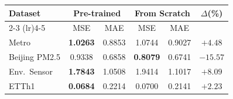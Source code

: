 \begin{tabular}{lccccc}
\toprule
\multirow{2}{*}{Dataset} & \multicolumn{2}{c}{Pre-trained} & \multicolumn{2}{c}{From Scratch} & \multirow{2}{*}{$\Delta$(\%)} \\
\cmidrule(lr){2-3} \cmidrule(lr){4-5}
 & MSE & MAE & MSE & MAE & \\
\midrule
Metro          & \textbf{1.0263} & 0.8853 & 1.0744          & 0.9027 & $+4.48$  \\
Beijing PM2.5  & 0.9338          & 0.6858 & \textbf{0.8079} & 0.6741 & $-15.57$ \\
Env.\ Sensor   & \textbf{1.7843} & 1.0508 & 1.9414          & 1.1017 & $+8.09$  \\
ETTh1          & \textbf{0.0684} & 0.2214 & 0.0700          & 0.2141 & $+2.23$  \\
\bottomrule
\end{tabular}
